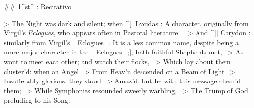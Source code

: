 ## 1^st^ \mvmt: Recitativo


> The Night was dark and silent; when ^[| Lycidas : A character, originally from Virgil's \textit{Eclogues}, who appears often in Pastoral literature.] \
> And ^[| Corydon : similarly from Virgil's _Eclogues_. It is a less common name, despite being a more major character in the _Eclogues_;], both faithful Shepherds met,  \
> As wont to meet each other; and watch their flocks,  \
> Which lay about them cluster’d:  when an Angel  \
> From Heav’n descended on a Beam of Light  \
> Insufferably glorious: they stood  \
> Amaz’d: but he with this message chear’d them;  \
> While Symphonies resounded sweetly warbling,  \
> The Trump of God preluding to his Song.
